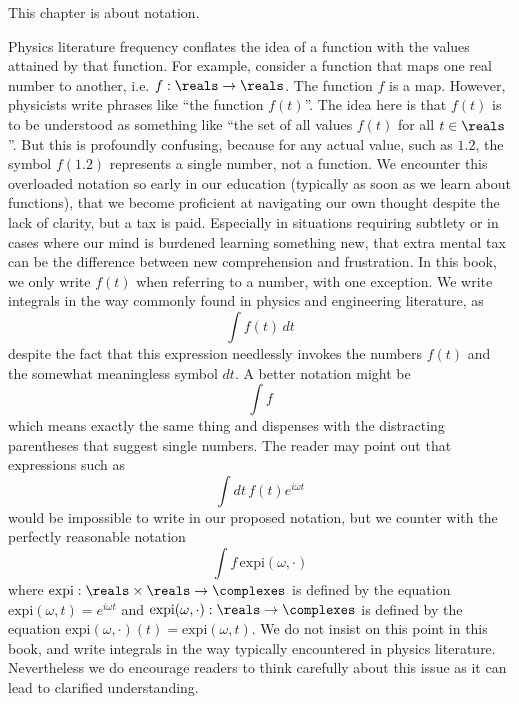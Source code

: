
This chapter is about notation.

Physics literature frequency conflates the idea of a function with the values attained by that function.
For example, consider a function that maps one real number to another, i.e. $f: \reals \rightarrow \reals$.
The function $f$ is a map.
However, physicists write phrases like ``the function $f(t)$''.
The idea here is that $f(t)$ is to be understood as something like ``the set of all values $f(t)$ for all $t \in \reals$''.
But this is profoundly confusing, because for any actual value, such as $1.2$, the symbol $f(1.2)$ represents a single number, not a function.
We encounter this overloaded notation so early in our education (typically as soon as we learn about functions), that we become proficient at navigating our own thought despite the lack of clarity, but a tax is paid.
Especially in situations requiring subtlety or in cases where our mind is burdened learning something new, that extra mental tax can be the difference between new comprehension and frustration.
In this book, we only write $f(t)$ when referring to a number, with one exception.
We write integrals in the way commonly found in physics and engineering literature, as
\begin{equation*}
  \int f(t) \, dt
\end{equation*}
despite the fact that this expression needlessly invokes the numbers $f(t)$ and the somewhat meaningless symbol $dt$.
A better notation might be
\begin{equation*}
  \int f
\end{equation*}
which means exactly the same thing and dispenses with the distracting parentheses that suggest single numbers.
The reader may point out that expressions such as
\begin{equation*}
  \int dt \, f(t) e^{i \omega t}
\end{equation*}
would be impossible to write in our proposed notation, but we counter with the perfectly reasonable notation
\begin{equation*}
  \int f \, \text{expi}(\omega, \cdot)
\end{equation*}
where $\text{expi}: \reals \times \reals \rightarrow \complexes$ is defined by the equation $\text{expi}(\omega, t) = e^{i \omega t}$ and $\text{expi}(\omega, \cdot): \reals \rightarrow \complexes$ is defined by the equation $\text{expi}(\omega, \cdot)(t) = \text{expi}(\omega, t)$.
We do not insist on this point in this book, and write integrals in the way typically encountered in physics literature.
Nevertheless we do encourage readers to think carefully about this issue as it can lead to clarified understanding.


